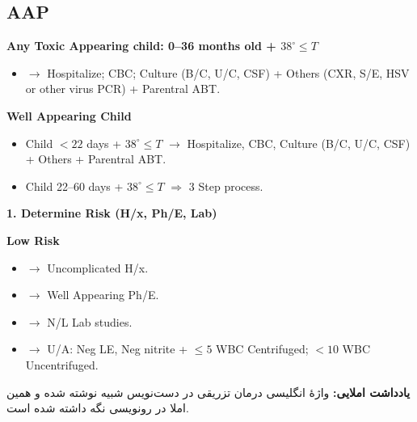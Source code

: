 \documentclass[12pt,a4paper]{article}
\begin{document}
\begin{latin}
\subsection*{AAP}
\textbf{Any Toxic Appearing child: 0--36 months old + \(38^\circ\leq T\)}
\begin{itemize}
\item \(\longrightarrow\) Hospitalize; CBC; Culture (B/C, U/C, CSF) + Others (CXR, S/E, HSV or other virus PCR) + Parentral ABT.
\end{itemize}

\textbf{Well Appearing Child}
\begin{itemize}
\item Child \(<22\) days + \(38^\circ\leq T\)
  \(\longrightarrow\) Hospitalize, CBC, Culture (B/C, U/C, CSF) + Others + Parentral ABT.
\item Child 22--60 days + \(38^\circ\leq T\) \(\Longrightarrow\) 3 Step process.
\end{itemize}

\textbf{1. Determine Risk (H/x, Ph/E, Lab)}

\textbf{Low Risk}
\begin{itemize}
\item \(\longrightarrow\) Uncomplicated H/x.
\item \(\longrightarrow\) Well Appearing Ph/E.
\item \(\longrightarrow\) N/L Lab studies.
\item \(\longrightarrow\) U/A: Neg LE, Neg nitrite + \(\leq5\) WBC Centrifuged;
  \(<10\) WBC Uncentrifuged.
\end{itemize}
\end{latin}
\textbf{یادداشت املایی:} واژهٔ انگلیسی درمان تزریقی در دست‌نویس شبیه  نوشته شده و همین املا در رونویسی نگه داشته شده است.
\end{document}
